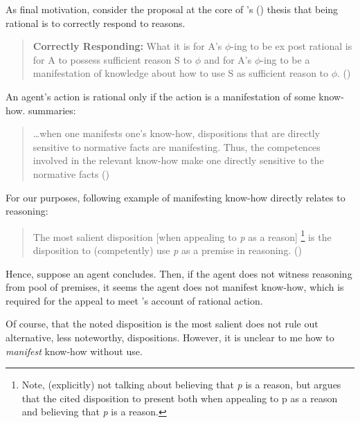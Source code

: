 \begin{note}
  As final motivation, consider the proposal at the core of \citeauthor{Lord:2018aa}'s (\Citeyear{Lord:2018aa}) thesis that being rational is to correctly respond to reasons.

  \begin{quote}
    \textbf{Correctly Responding:} What it is for A's \(\phi\)-ing to be ex post rational is for A to possess sufficient reason S to \(\phi\) and for A's \(\phi\)-ing to be a manifestation of knowledge about how to use S as sufficient reason to \(\phi\).%
    \mbox{}\hfill\mbox{(\Citeyear[143]{Lord:2018aa})}
  \end{quote}

  An agent's action is rational only if the action is a manifestation of some know-how.
  \citeauthor{Lord:2018aa} summaries:

  \begin{quote}
    \dots when one manifests one's know-how, dispositions that are directly sensitive to normative facts are manifesting. Thus, the competences involved in the relevant know-how make one directly sensitive to the normative facts%
    \mbox{}\hfill\mbox{(\Citeyear[16]{Lord:2018aa})}
  \end{quote}

  For our purposes, following example of manifesting know-how directly relates to reasoning:

  \begin{quote}
    The most salient disposition [when appealing to \emph{p} as a reason]%
    \footnote{Note, \citeauthor{Lord:2018aa} (explicitly) not talking about believing that \emph{p} is a reason, but argues that the cited disposition to present both when appealing to p as a reason and believing that \emph{p} is a reason.}
    is the disposition to (competently) use \emph{p} as a premise in reasoning.%
    \mbox{}\hfill\mbox{(\Citeyear[25]{Lord:2018aa})}
  \end{quote}

  Hence, suppose an agent concludes.
  Then, if the agent does not witness reasoning from pool of premises, it seems the agent does not manifest know-how, which is required for the appeal to meet \citeauthor{Lord:2018aa}'s account of rational action.

  Of course, that the noted disposition is the most salient does not rule out alternative, less noteworthy, dispositions.
  However, it is unclear to me how to \emph{manifest} know-how without use.
\end{note}

